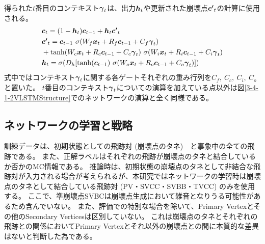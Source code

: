 得られた$t$番目のコンテキスト${\mbox{\boldmath{$\gamma$}}}_{t}$は、出力${\mbox{\boldmath{$h$}}}_{t}$や更新された崩壊点${\mbox{\boldmath{$c'$}}}_{t}$の計算に使用される。
\begin{equation}
 \begin{split}
  &{\mbox{\boldmath{$c$}}}_{t} 
  = (1-{\mbox{\boldmath{$h$}}}_t) {\mbox{\boldmath{$c$}}}_{t-1} + {\mbox{\boldmath{$h$}}}_t {\mbox{\boldmath{$c'$}}}_{t}\\
  &{\mbox{\boldmath{$c'$}}}_{t}
  = {\mbox{\boldmath{$c$}}}_{t-1} \  \sigma (W_f {\mbox{\boldmath{$x$}}}_t + R_f {\mbox{\boldmath{$c$}}}_{t-1} + C_f {\mbox{\boldmath{$\gamma$}}}_{t})\\
  &+ \tanh (W_c {\mbox{\boldmath{$x$}}}_t + R_c {\mbox{\boldmath{$c$}}}_{t-1} + C_c {\mbox{\boldmath{$\gamma$}}}_{t}) \  \sigma (W_i {\mbox{\boldmath{$x$}}}_t + R_i {\mbox{\boldmath{$c$}}}_{t-1} + C_i {\mbox{\boldmath{$\gamma$}}}_{t})\\
  &{\mbox{\boldmath{$h$}}}_{t} 
  = \sigma (D_h [\tanh({\mbox{\boldmath{$c$}}}_{t-1}) \  \sigma (W_o {\mbox{\boldmath{$x$}}}_t + R_o {\mbox{\boldmath{$c$}}}_{t-1} + C_o {\mbox{\boldmath{$\gamma$}}}_{t}) ])
 \end{split}
\end{equation}
式中ではコンテキスト${\mbox{\boldmath{$\gamma$}}}_{t}$に関する各ゲートそれぞれの重み行列を$C_f,\ C_c,\ C_i,\ C_o$と置いた。
$t$番目のコンテキスト${\mbox{\boldmath{$\gamma$}}}_{t}$についての演算を加えている点以外は図\ref{3-4-1-2VLSTMStructure}でのネットワークの演算と全く同様である。


\subsection{ネットワークの学習と戦略} \label{Net:VLSTM:TrainingandStrategyofVLSTM}

訓練データは、初期状態としての飛跡対 (崩壊点のタネ)　と事象中の全ての飛跡である。
また、正解ラベルはそれぞれの飛跡が崩壊点のタネと結合しているか否かのMC情報である。
推論時は、初期状態の崩壊点のタネとして非結合な飛跡対が入力される場合が考えられるが、本研究ではネットワークの学習時は崩壊点のタネとして結合している飛跡対 (PV・SVCC・SVBB・TVCC) のみを使用する。
ここで、準崩壊点SVBCは崩壊点生成において雑音となりうる可能性があるため含んでいない。
また、評価での特別な場合を除いて、Primary Vertexとその他のSecondary Verticesは区別していない。
これは崩壊点のタネとそれぞれの飛跡との関係においてPrimary Vertexとそれ以外の崩壊点との間に本質的な差異はないと判断した為である。

